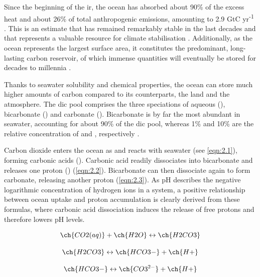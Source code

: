 Since the beginning of the \ac{ir}, the ocean has absorbed about 90\% of the excess heat \citep{butenschon2021alkalinization} and about 26\% of total  anthropogenic emissions, amounting to 2.9 GtC yr\textsuperscript{-1} \citep{friedlingstein2022global}. This is an estimate that has remained remarkably stable in the last decades and that represents a valuable resource for climate stabilisation \citep{friedlingstein2022global, scott2019role}. Additionally, as the ocean represents the largest surface area, it constitutes the predominant, long-lasting carbon reservoir, of which immense quantities will eventually be stored for decades to millennia \citep{archer2009atmospheric}. 

Thanks to seawater solubility and chemical properties, the ocean can store much higher amounts of carbon compared to its counterparts, the land and the atmosphere. The \ac{dic} pool comprises the three speciations of aqueous  (), bicarbonate () and carbonate (). Bicarbonate is by far the most abundant in seawater, accounting for about 90\% of the \ac{dic} pool, whereas 1\% and 10\% are the relative concentration of  and , respectively \citep{marchitto2007paleoceanography}. 

Carbon dioxide enters the ocean as  and reacts with seawater (see \ref{eqn:2.1}), forming carbonic acids (). Carbonic acid readily dissociates into bicarbonate and releases one proton () (\ref{eqn:2.2}). Bicarbonate can then dissociate again to form carbonate, releasing another proton (\ref{eqn:2.3}). As pH describes the negative logarithmic concentration of hydrogen ions in a system, a positive relationship between ocean  uptake and proton accumulation is clearly derived from these formulas, where carbonic acid dissociation induces the release of free protons and therefore lowers pH levels. 

\begin{center}

\begin{equation}
\label{eqn:2.1}
\ch{CO2(aq)} + \ch{H2O} \leftrightarrow \ch{H2CO3}
\end{equation}

\begin{equation} 
\label{eqn:2.2}
\ch{H2CO3} \leftrightarrow \ch{HCO3-} + \ch{H+}
\end{equation}

\begin{equation} 
\label{eqn:2.3}
\ch{HCO3-} \leftrightarrow \ch{CO3^{2-}} + \ch{H+}
\end{equation}

\end{center}

